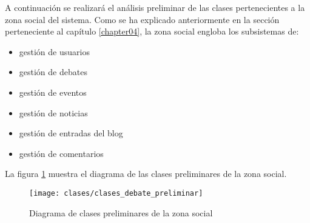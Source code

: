 A continuación se realizará el análisis preliminar de las clases pertenecientes a la zona social del sistema.  Como se ha explicado anteriormente en la sección  perteneciente al capítulo \ref{chapter04}, la zona social engloba los subsistemas de:
\begin{itemize}
	\item gestión de usuarios
	\item gestión de debates
	\item gestión de eventos
	\item gestión de noticias
	\item gestión de entradas del blog
	\item gestión de comentarios
\end{itemize}

La figura \ref{fig:clases_preliminares_modelo_debate} muestra el diagrama de las clases preliminares de la zona social.

\begin{landscape}
	\begin{figure}[ht]
		\centering
		\texttt{[image: clases/clases\_debate\_preliminar]}
		\caption{Diagrama de clases preliminares de la zona social}
		\label{fig:clases_preliminares_modelo_debate}
	\end{figure}
\end{landscape}

